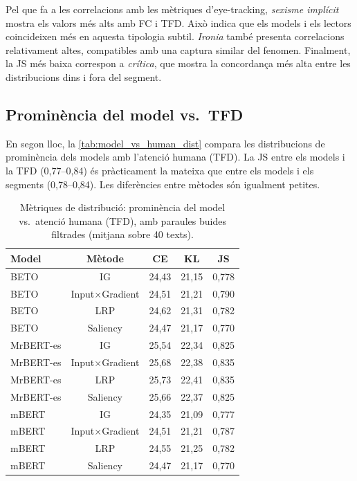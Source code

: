 Pel que fa a les correlacions amb les mètriques d'eye-tracking, \textit{sexisme implícit} mostra els valors més alts amb FC i TFD. Això indica que els models i els lectors coincideixen més en aquesta tipologia subtil.
\textit{Ironia} també presenta correlacions relativament altes, compatibles amb una captura similar del fenomen.
Finalment, la JS més baixa correspon a \textit{crítica}, que mostra la concordança més alta entre les distribucions dins i fora del segment.

\newpage
\subsection{Prominència del model vs.\ TFD}

En segon lloc, la \autoref{tab:model_vs_human_dist} compara les distribucions de prominència dels models amb l'atenció humana (TFD).
La JS entre els models i la TFD (0,77--0,84) és pràcticament la mateixa que entre els models i els segments (0,78--0,84).
Les diferències entre mètodes són igualment petites.
\iftables
\begin{table}[htbp]
\small
\centering
\begin{tabular}{lcccc}
\toprule
\textbf{Model} & \textbf{Mètode} & \textbf{CE} & \textbf{KL} & \textbf{JS} \\
\midrule
BETO & IG & 24,43 & 21,15 & 0,778 \\
BETO & Input$\times$Gradient & 24,51 & 21,21 & 0,790 \\
BETO & LRP & 24,62 & 21,31 & 0,782 \\
BETO & Saliency & 24,47 & 21,17 & 0,770 \\
MrBERT-es & IG & 25,54 & 22,34 & 0,825 \\
MrBERT-es & Input$\times$Gradient & 25,68 & 22,38 & 0,835 \\
MrBERT-es & LRP & 25,73 & 22,41 & 0,835 \\
MrBERT-es & Saliency & 25,66 & 22,37 & 0,825 \\
mBERT & IG & 24,35 & 21,09 & 0,777 \\
mBERT & Input$\times$Gradient & 24,51 & 21,21 & 0,787 \\
mBERT & LRP & 24,55 & 21,25 & 0,782 \\
mBERT & Saliency & 24,47 & 21,17 & 0,770 \\
\bottomrule
\end{tabular}
\caption{Mètriques de distribució: prominència del model vs.\ atenció humana (TFD), amb paraules buides filtrades (mitjana sobre 40 texts).}
\label{tab:model_vs_human_dist}
\end{table}
\fi

